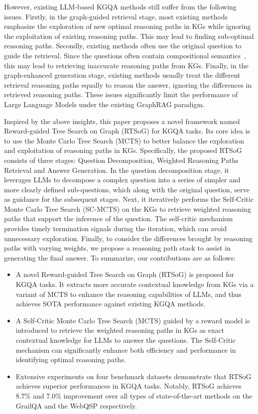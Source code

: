 \documentclass[lettersize,journal]{IEEEtran}
\begin{document}
However, existing LLM-based KGQA methods still suffer from the following issues.
Firstly, in the graph-guided retrieval stage, most existing methods emphasize the exploration of new optimal reasoning paths in KGs while ignoring the exploitation of existing reasoning paths. This may lead to finding sub-optimal reasoning paths. 
Secondly, existing methods often use the original question to guide the retrieval. Since the questions often contain compositional semantics~\cite{lan2022complex}, this may lead to retrieving inaccurate reasoning paths from KGs. 
Finally, in the graph-enhanced generation stage, existing methods usually treat the different retrieval reasoning paths equally to reason the answer, ignoring the differences in retrieved reasoning paths. These issues significantly limit the performance of Large Language Models under the existing GraphRAG paradigm.

Inspired by the above insights, this paper proposes a novel framework named Reward-guided Tree Search on Graph (RTSoG) for KGQA tasks. Its core idea is to use the Monte Carlo Tree Search (MCTS) to better balance the exploration and exploitation of reasoning paths in KGs. Specifically, the proposed RTSoG consists of three stages: Question Decomposition, Weighted Reasoning Paths Retrieval and Answer Generation. In the question decomposition stage, it leverages LLMs to decompose a complex question into a series of simpler and more clearly defined sub-questions, which along with the original question, serve as guidance for the subsequent stages. Next, it iteratively performs the Self-Critic Monte Carlo Tree Search (SC-MCTS) on the KGs to retrieve weighted reasoning paths that support the inference of the question. The self-critic mechanism provides timely termination signals during the iteration, which can avoid unnecessary exploration. Finally, to consider the differences brought by reasoning paths with varying weights, we propose a reasoning path stack to assist in generating the final answer. To summarize, our contributions are as follows:
\begin{itemize}
    \item A novel Reward-guided Tree Search on Graph (RTSoG) is proposed for KGQA tasks. It extracts more accurate contextual knowledge from KGs via a variant of MCTS to enhance the reasoning capabilities of LLMs, and thus achieves SOTA performance against existing KGQA methods. 
    \item A Self-Critic Monte Carlo Tree Search (MCTS) guided by a reward model is introduced to retrieve the weighted reasoning paths in KGs as exact contextual knowledge for LLMs to answer the questions. The Self-Critic mechanism can significantly enhance both efficiency and performance in identifying optimal reasoning paths.
    \item Extensive experiments on four benchmark datasets demonstrate that RTSoG achieves superior performances in KGQA tasks. Notably, RTSoG achieves 8.7\% and 7.0\% improvement over all types of state-of-the-art methods on the GrailQA and the WebQSP respectively.
\end{itemize}
\end{document}
